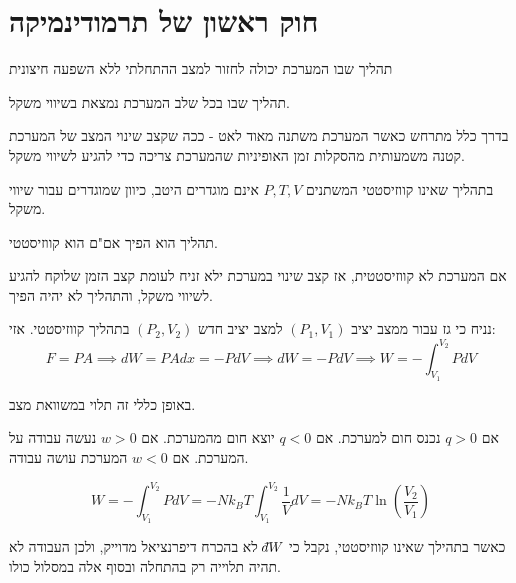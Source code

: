 \documentclass{tstextbook}
\begin{document}
\section{חוק ראשון של תרמודינמיקה}

\begin{definition}
תהליך שבו המערכת יכולה לחזור למצב ההתחלתי ללא השפעה חיצונית

\end{definition}
\begin{definition}
תהליך שבו בכל שלב המערכת נמצאת בשיווי משקל.

\end{definition}
בדרך כלל מתרחש כאשר המערכת משתנה מאוד לאט - ככה שקצב שינוי המצב של המערכת קטנה משמעותית מהסקלות זמן האופיניות שהמערכת צריכה כדי להגיע לשיווי משקל. 

\begin{remark}
בתהליך שאינו קווזיסטטי המשתנים \(P,T,V\) אינם מוגדרים היטב, כיוון שמוגדרים עבור שיווי משקל.

\end{remark}
\begin{proposition}
תהליך הוא הפיך אם"ם הוא קווזיסטטי.

\end{proposition}
אם המערכת לא קווזיסטטית, אז קצב שינוי במערכת ילא זניח לעומת קצב הזמן שלוקח להגיע לשיווי משקל, והתהליך לא יהיה הפיך.

\begin{proposition}[עבודה של גז]
נניח כי גז עבור ממצב יציב \((P_{1},V_{1})\) למצב יציב חדש \((P_{2},V_{2})\) בתהליך קווזיסטטי. אזי:
$$F=PA\implies dW = PAdx=-PdV\implies dW=-PdV\implies W=-\int_{V_{1}}^{V_{2}}PdV$$

\end{proposition}
\begin{remark}
באופן כללי זה תלוי במשוואת מצב.

\end{remark}
\begin{proposition}
אם \(q>0\) נכנס חום למערכת. 
אם \(q<0\) יוצא חום מהמערכת.
אם \(w>0\) נעשה עבודה על המערכת.
אם \(w<0\) המערכת עושה עבודה.

\end{proposition}
\begin{proposition}
$$W=-\int_{V_{1}}^{V_{2}}PdV=-Nk_{B}T\int_{V_{1}}^{V_{2}} \frac{1}{V}dV=-Nk_{B}T\ln\left( \frac{V_{2}}{V_{1}} \right)$$

\end{proposition}
כאשר בתהילך שאינו קווזיסטטי, נקבל כי \(\;\bar{}\mkern-7.5mu dW\)  לא בהכרח דיפרנציאל מדוייק, ולכן העבודה לא תהיה תלוייה רק בהתחלה ובסוף אלה במסלול כולו.
\end{document}
